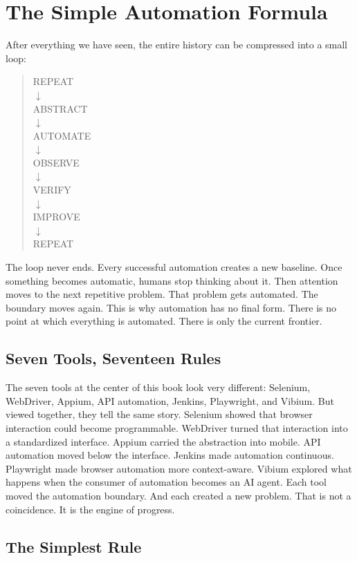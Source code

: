 \documentclass[11pt,twoside]{book}
\begin{document}
\chapter*{The Simple Automation Formula}

After everything we have seen, the entire history can be compressed into a small loop:
\begin{quote}
\centering
REPEAT\\
$\downarrow$\\
ABSTRACT\\
$\downarrow$\\
AUTOMATE\\
$\downarrow$\\
OBSERVE\\
$\downarrow$\\
VERIFY\\
$\downarrow$\\
IMPROVE\\
$\downarrow$\\
REPEAT
\end{quote}
The loop never ends.
Every successful automation creates a new baseline.
Once something becomes automatic, humans stop thinking about it.
Then attention moves to the next repetitive problem.
That problem gets automated.
The boundary moves again.
This is why automation has no final form.
There is no point at which everything is automated.
There is only the current frontier.

\section*{Seven Tools, Seventeen Rules}

The seven tools at the center of this book look very different:
Selenium, WebDriver, Appium, API automation, Jenkins, Playwright, and Vibium.
But viewed together, they tell the same story.
Selenium showed that browser interaction could become programmable.
WebDriver turned that interaction into a standardized interface.
Appium carried the abstraction into mobile.
API automation moved below the interface.
Jenkins made automation continuous.
Playwright made browser automation more context-aware.
Vibium explored what happens when the consumer of automation becomes an AI agent.
Each tool moved the automation boundary.
And each created a new problem.
That is not a coincidence.
It is the engine of progress.

\section*{The Simplest Rule}
\end{document}
